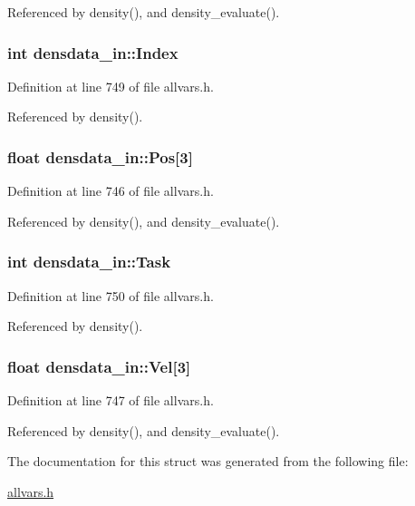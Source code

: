 Referenced by density(), and density\_\-evaluate().

\hypertarget{structdensdata__in_a1c79a4d4fdcc9e483946193f2d030308}{
\subsubsection[{Index}]{\setlength{\rightskip}{0pt plus 5cm}int {\bf densdata\_\-in::Index}}}
\label{structdensdata__in_a1c79a4d4fdcc9e483946193f2d030308}


Definition at line 749 of file allvars.h.



Referenced by density().

\hypertarget{structdensdata__in_a619b6e6d76f91b047119249915527164}{
\subsubsection[{Pos}]{\setlength{\rightskip}{0pt plus 5cm}float {\bf densdata\_\-in::Pos}\mbox{[}3\mbox{]}}}
\label{structdensdata__in_a619b6e6d76f91b047119249915527164}


Definition at line 746 of file allvars.h.



Referenced by density(), and density\_\-evaluate().

\hypertarget{structdensdata__in_a010be125c58096f5cd2fec47f210747b}{
\subsubsection[{Task}]{\setlength{\rightskip}{0pt plus 5cm}int {\bf densdata\_\-in::Task}}}
\label{structdensdata__in_a010be125c58096f5cd2fec47f210747b}


Definition at line 750 of file allvars.h.



Referenced by density().

\hypertarget{structdensdata__in_a8df7f2cfb255b800bbbbb69d674ae4ac}{
\subsubsection[{Vel}]{\setlength{\rightskip}{0pt plus 5cm}float {\bf densdata\_\-in::Vel}\mbox{[}3\mbox{]}}}
\label{structdensdata__in_a8df7f2cfb255b800bbbbb69d674ae4ac}


Definition at line 747 of file allvars.h.



Referenced by density(), and density\_\-evaluate().



The documentation for this struct was generated from the following file:\begin{DoxyCompactItemize}
\item 
\hyperlink{allvars_8h}{allvars.h}\end{DoxyCompactItemize}
